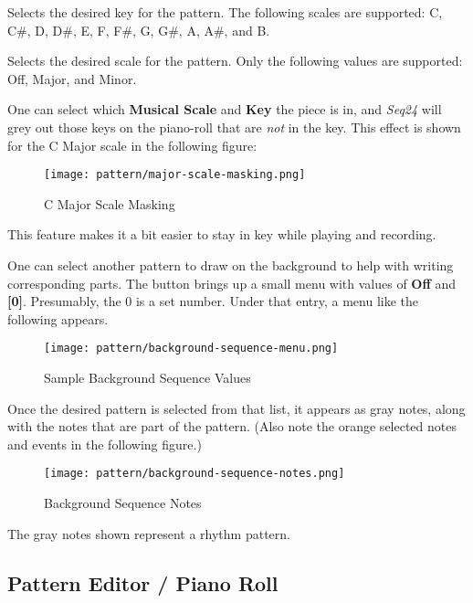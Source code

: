    Selects the desired key for the pattern.  The following scales are
   supported:  C, C\#, D, D\#, E, F, F\#, G, G\#, A, A\#, and B.

   Selects the desired scale for the pattern.
   Only the following values are supported: Off, Major, and Minor.

   One can select which \textbf{Musical Scale} and
   \textbf{Key} the piece is in,
   and \textsl{Seq24} will grey out those keys on the piano-roll that
   are \textsl{not} in the key.
   This effect is shown for the C Major scale in the following figure:

\begin{figure}[H]
   \centering 
   \texttt{[image: pattern/major-scale-masking.png]}
   \caption{C Major Scale Masking}
   \label{fig:pattern_editor_major_scale_masking}
\end{figure}

   This feature makes it a bit easier to stay in key while playing and
   recording.

   One can select another pattern to draw on the background to help with
   writing corresponding parts.
   The button brings up a small menu with values of \textbf{Off} and
   \textbf{[0]}.  Presumably, the 0 is a set number.  Under that entry, a
   menu like the following appears.

\begin{figure}[H]
   \centering 
   \texttt{[image: pattern/background-sequence-menu.png]}
   \caption{Sample Background Sequence Values}
   \label{fig:pattern_editor_background_sequence_menu}
\end{figure}

   Once the desired pattern is selected from that list, it appears as
   gray notes, along with the notes that are part of the pattern.  (Also
   note the orange selected notes and events in the following figure.)

\begin{figure}[H]
   \centering 
   \texttt{[image: pattern/background-sequence-notes.png]}
   \caption{Background Sequence Notes}
   \label{fig:pattern_editor_background_sequence_notes}
\end{figure}

   The gray notes shown represent a rhythm pattern.

\subsection{Pattern Editor / Piano Roll}
\label{subsec:seq24_pattern_editor_piano_roll}

